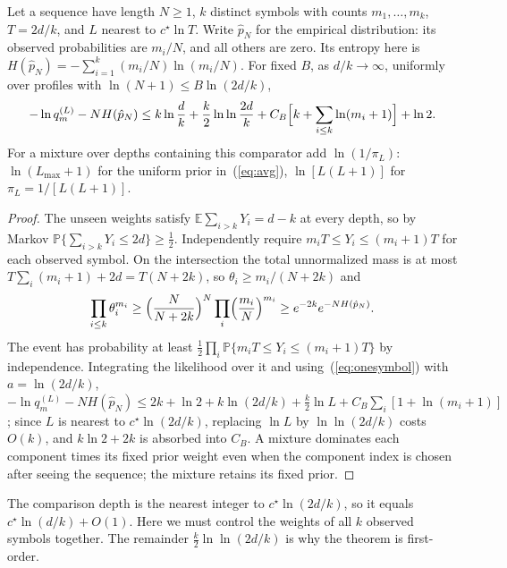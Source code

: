 \documentclass[anon]{alt2027}
\newcommand{\E}{\mathbb{E}}
\newcommand{\Prob}{\mathbb{P}}
\newcommand{\cstar}{c^{\star}}
\newcommand{\Lmax}{L_{\max}}
\renewcommand{\eqref}[1]{(\ref{#1})}
\begin{document}
\begin{proposition}
\label{prop:profile}
Let a sequence have length $N\ge1$, $k$ distinct symbols with counts $m_1,\dots,m_k$, $T=2d/k$, and $L$ nearest to $\cstar\ln T$. Write $\hat p_N$ for the empirical distribution: its observed probabilities are $m_i/N$, and all others are zero. Its entropy here is $H(\hat p_N)=-\sum_{i=1}^k(m_i/N)\ln(m_i/N)$. For fixed $B$, as $d/k\to\infty$, uniformly over profiles with $\ln(N+1)\le B\ln(2d/k)$,
\begin{equation}
\label{eq:profile}
-\ln q^{(L)}_m-NH(\hat p_N)\le k\ln\frac dk+\frac k2\ln\ln\frac{2d}{k}+C_B\Bigl[k+\sum_{i\le k}\ln(m_i+1)\Bigr]+\ln2 .
\end{equation}
For a mixture over depths containing this comparator add $\ln(1/\pi_L)$: $\ln(\Lmax+1)$ for the uniform prior in~\eqref{eq:avg}, $\ln[L(L+1)]$ for $\pi_L=1/[L(L+1)]$.
\end{proposition}
\begin{proof}
The unseen weights satisfy $\E\sum_{i>k}Y_i=d-k$ at every depth, so by Markov $\Prob\{\sum_{i>k}Y_i\le2d\}\ge\frac12$. Independently require $m_iT\le Y_i\le(m_i+1)T$ for each observed symbol. On the intersection the total unnormalized mass is at most $T\sum_i(m_i+1)+2d=T(N+2k)$, so $\theta_i\ge m_i/(N+2k)$ and
\[
\prod_{i\le k}\theta_i^{m_i}\ge\Bigl(\frac{N}{N+2k}\Bigr)^N\prod_i\Bigl(\frac{m_i}{N}\Bigr)^{m_i}\ge e^{-2k}e^{-NH(\hat p_N)} .
\]
The event has probability at least $\frac12\prod_i\Prob\{m_iT\le Y_i\le(m_i+1)T\}$ by independence. Integrating the likelihood over it and using~\eqref{eq:onesymbol} with $a=\ln(2d/k)$,
$-\ln q^{(L)}_m-NH(\hat p_N)\le2k+\ln2+k\ln(2d/k)+\frac k2\ln L+C_B\sum_i[1+\ln(m_i+1)]$; since $L$ is nearest to $\cstar\ln(2d/k)$, replacing $\ln L$ by $\ln\ln(2d/k)$ costs $O(k)$, and $k\ln2+2k$ is absorbed into $C_B$. A mixture dominates each component times its fixed prior weight even when the component index is chosen after seeing the sequence; the mixture retains its fixed prior.
\end{proof}
The comparison depth is the nearest integer to $\cstar\ln(2d/k)$, so it equals $\cstar\ln(d/k)+O(1)$. Here we must control the weights of all $k$ observed symbols together. The remainder $\frac k2\ln\ln(2d/k)$ is why the theorem is first-order.
\end{document}
